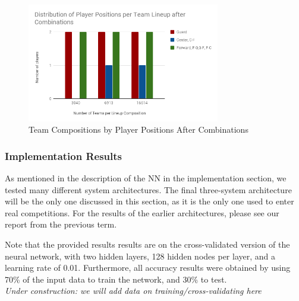 \begin{figure}[ht]
    \centering
    \includegraphics[width=0.75\textwidth]{figures/distributionAfterCombination}
    \caption{Team Compositions by Player Positions After Combinations}
    \label{fig:distributionAfterCombination}
\end{figure}

\subsubsection{Implementation Results}
As mentioned in the description of the NN in the implementation section, we tested many different system architectures. The final three-system architecture will be the only one discussed in this section, as it is the only one used to enter real competitions. For the results of the earlier architectures, please see our report from the previous term.

Note that the provided results results are on the cross-validated version of the neural network, with two hidden layers, 128 hidden nodes per layer, and a learning rate of 0.01. Furthermore, all accuracy results were obtained by using 70\% of the input data to train the network, and 30\% to test.\\

\textit{Under construction: we will add data on training/cross-validating here}

